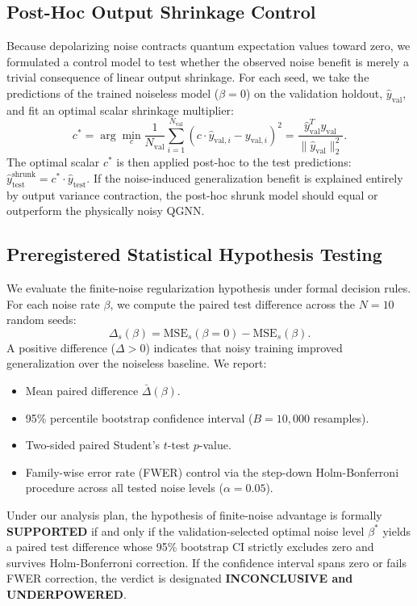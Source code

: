 \documentclass[sn-apacite,Numbered]{sn-jnl}
\begin{document}
\subsection{Post-Hoc Output Shrinkage Control}
Because depolarizing noise contracts quantum expectation values toward zero, we formulated a control model to test whether the observed noise benefit is merely a trivial consequence of linear output shrinkage. For each seed, we take the predictions of the trained noiseless model ($\beta = 0$) on the validation holdout, $\hat{y}_{\text{val}}$, and fit an optimal scalar shrinkage multiplier:
\begin{equation}
c^* = \arg\min_c \frac{1}{N_{\text{val}}} \sum_{i=1}^{N_{\text{val}}} (c \cdot \hat{y}_{\text{val}, i} - y_{\text{val}, i})^2 = \frac{\hat{y}_{\text{val}}^T y_{\text{val}}}{\|\hat{y}_{\text{val}}\|_2^2}.
\label{eq:shrinkage}
\end{equation}
The optimal scalar $c^*$ is then applied post-hoc to the test predictions: $\hat{y}_{\text{test}}^{\text{shrunk}} = c^* \cdot \hat{y}_{\text{test}}$. If the noise-induced generalization benefit is explained entirely by output variance contraction, the post-hoc shrunk model should equal or outperform the physically noisy QGNN.

\subsection{Preregistered Statistical Hypothesis Testing}
We evaluate the finite-noise regularization hypothesis under formal decision rules. For each noise rate $\beta$, we compute the paired test difference across the $N=10$ random seeds:
\begin{equation}
\Delta_s(\beta) = \text{MSE}_s(\beta = 0) - \text{MSE}_s(\beta).
\end{equation}
A positive difference ($\Delta > 0$) indicates that noisy training improved generalization over the noiseless baseline. We report:
\begin{itemize}
    \item Mean paired difference $\bar{\Delta}(\beta)$.
    \item 95\% percentile bootstrap confidence interval ($B = 10{,}000$ resamples).
    \item Two-sided paired Student's $t$-test $p$-value.
    \item Family-wise error rate (FWER) control via the step-down Holm-Bonferroni procedure across all tested noise levels ($\alpha = 0.05$).
\end{itemize}
Under our analysis plan, the hypothesis of finite-noise advantage is formally \textbf{SUPPORTED} if and only if the validation-selected optimal noise level $\beta^*$ yields a paired test difference whose 95\% bootstrap CI strictly excludes zero and survives Holm-Bonferroni correction. If the confidence interval spans zero or fails FWER correction, the verdict is designated \textbf{INCONCLUSIVE and UNDERPOWERED}.
\end{document}

